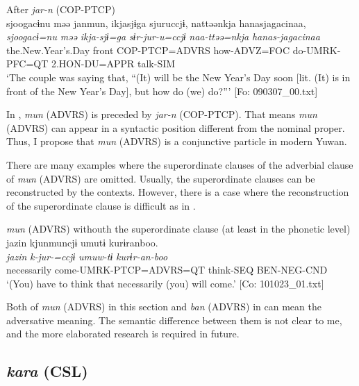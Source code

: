 \ea\label{ex:10.32}   After \textit{jar-n} (COP-PTCP)\\
      \glll    sjoogacɨnu  məə  janmun,  ikjasjɨga  sjuruccjɨ,  nattəənkja  hanasjagacinaa,\\
    \textit{sjoogacɨ=nu}  \textit{məə}  \textit{}  \textit{ikja-sjɨ=ga}   \textit{sɨr-jur-u=ccjɨ}  \textit{naa-ttəə=nkja}  \textit{hanas-jagacinaa}\\
    the.New.Year’s.Day  front  COP-PTCP=ADVRS  how-ADVZ=FOC  do-UMRK-PFC=QT  2.HON-DU=APPR  talk-SIM\\
    \glt     ‘The couple was saying that, “(It) will be the New Year’s Day soon [lit. (It) is in front of the New Year’s Day], but how do (we) do?”’ [Fo: 090307\_00.txt]
\z

In , \textit{mun} (ADVRS) is preceded by \textit{jar-n} (COP-PTCP). That means \textit{mun} (ADVRS) can appear in a syntactic position different from the nominal proper. Thus, I propose that \textit{mun} (ADVRS) is a conjunctive particle in modern Yuwan.

  There are many examples where the superordinate clauses of the adverbial clause of \textit{mun} (ADVRS) are omitted. Usually, the superordinate clauses can be reconstructed by the contexts. However, there is a case where the reconstruction of the superordinate clause is difficult as in .

\ea\label{ex:10.33}   \textit{mun} (ADVRS) withouth the superordinate clause (at least in the phonetic level)\\
      \glll    jazin  kjunmuncjɨ  umutɨ  kurɨranboo.\\
    \textit{jazin}  \textit{k-jur-=ccjɨ}  \textit{umuw-tɨ}  \textit{kurɨr-an-boo}\\
    necessarily  come-UMRK-PTCP=ADVRS=QT  think-SEQ  BEN-NEG-CND\\
\glt     ‘(You) have to think that necessarily (you) will come.’  [Co: 101023\_01.txt]
\z

Both of \textit{mun} (ADVRS) in this section and \textit{ban} (ADVRS) in  can mean the adversative meaning. The semantic difference between them is not clear to me, and the more elaborated research is required in future.

\subsection{\textit{kara} (CSL)}\label{sec:10.2.3}

